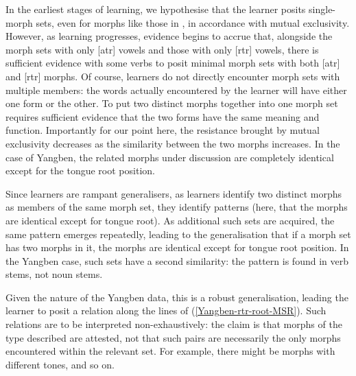 In the earliest stages of learning, we hypothesise that the learner posits single-morph sets, even for morphs like those in , in accordance with mutual exclusivity. However, as learning progresses, evidence begins to accrue that, alongside the morph sets with only [atr] vowels and those with only [rtr] vowels, there is sufficient evidence with some verbs to posit minimal morph sets with both [atr] and [rtr] morphs.  Of course, learners do not directly encounter morph sets with multiple members: the words actually encountered by the learner will have either one form or the other. To put two distinct morphs together into one morph set requires sufficient evidence that the two forms have the same meaning and function. Importantly for our point here, the resistance brought by mutual exclusivity decreases as the  similarity between the two morphs increases. In the case of Yangben, the related morphs under discussion are completely identical except for the tongue root position.

Since learners are rampant generalisers,  as learners identify two distinct morphs as members of the same morph set, they identify patterns (here, that the morphs are identical except for tongue root). As additional such sets are acquired, the same pattern emerges repeatedly, leading to the generalisation that if a morph set has two morphs in it, the morphs are identical except for tongue root position. In the Yangben case, such sets have a second similarity: the pattern is found  in verb stems, not noun stems. 

Given the nature of the Yangben data, this is a robust generalisation, leading the  learner to posit a relation along the lines of (\ref{Yangben-rtr-root-MSR}). Such relations are to be interpreted non-exhaustively: the claim is that morphs of the type described are attested, not that such pairs are necessarily the only morphs encountered within the relevant set. For example, there might be morphs with different tones, and so on.

